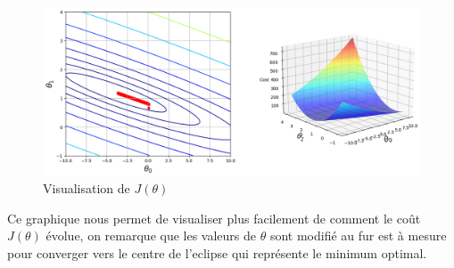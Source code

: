 \begin{figure}[!h]
    \begin{center}
        \includegraphics[width=1\textwidth]{./img/4-3.png}
        \caption{\label{fig:fig3}Visualisation de $J(\theta)$}  
    \end{center}
\end{figure}

Ce graphique nous permet de visualiser plus facilement de comment le coût $J(\theta)$ évolue, on remarque que les valeurs de $\theta$ sont modifié au fur est à mesure pour converger vers le centre de l'eclipse qui représente
le minimum optimal.
